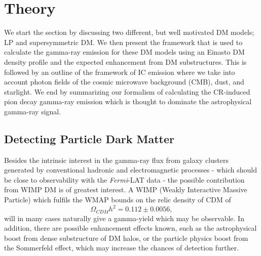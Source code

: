 \documentclass[10pt,aps,pra,reprint,amsmath,amsfonts,amssymb,showpacs,nofootinbib,floatfix]{revtex4-1}
\newcommand{\Fermi}{{\em Fermi}\xspace}
\begin{document}
\section{Theory}
\label{sect:theory}
We start the section by discussing two different, but well motivated
DM models; LP and supersymmetric DM. We then present the framework
that is used to calculate the gamma-ray emission for these DM models
using an Einasto DM density profile and the expected enhancement from
DM substructures. This is followed by an outline of the framework of
IC emission where we take into account photon fields of the cosmic
microwave background (CMB), dust, and starlight. We end by summarizing
our formalism of calculating the CR-induced pion decay gamma-ray
emission which is thought to dominate the astrophysical gamma-ray
signal.


\subsection{Detecting Particle Dark Matter}
\label{sect:PF}
Besides the intrinsic interest in the gamma-ray flux from galaxy
clusters generated by conventional hadronic and electromagnetic
processes - which should be close to observability with the \Fermi-LAT
data
\cite{1997ApJ...487..529B,2007A&A...473...41E,2010MNRAS.409..449P} -
the possible contribution from WIMP DM is of greatest interest. A WIMP
(Weakly Interactive Massive Particle) which fulfils the WMAP bounds on
the relic density of CDM of \cite{Komatsu:2010fb}
$$\Omega_{CDM}h^2=0.112\pm 0.0056,$$ will in many cases naturally give
a gamma-yield which may be observable. In addition, there are possible
enhancement effects known, such as the astrophysical boost from dense
substructure of DM halos, or the particle physics boost from the
Sommerfeld effect, which may increase the chances of detection
further.
\end{document}
